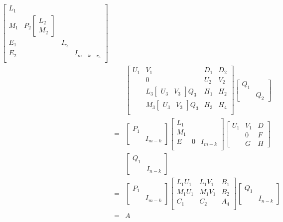 \documentclass{article}
\begin{document}
\begin{eqnarray*}
\left[
  \begin{array}{cccccc}
  L_1 &   \\
  M_1 & P_2
  \begin{bmatrix}
    L_2\\M_2
  \end{bmatrix}\\
  \hline
    E_1 &    & I_{r_3}\\
    E_2 &    & &I_{m-k-r_3}\\
  \end{array}
\right]
\\&&
\left[
\begin{array}{cc|cccc}
  U_1 & V_1 &D_1 & D_2\\
      & 0   & U_2& V_2 \\
      &L_3\begin{bmatrix}U_3&V_3\end{bmatrix} Q_3 &H_1 & H_2\\
      &M_3\begin{bmatrix}U_3&V_3\end{bmatrix} Q_3 &H_3  &H_4\\
\end{array}
\right]
  \begin{bmatrix}
    Q_1\\&Q_2
  \end{bmatrix}\\
&=&\begin{bmatrix}
    P_1\\&I_{m-k}
  \end{bmatrix}
\left[
  \begin{array}{cccccc}
  L_1 &   \\
  M_1 & \\
  \hline
    E &  0  & I_{m-k}\\
  \end{array}
\right]
\left[
\begin{array}{cc|cccc}
  U_1 & V_1 & D\\
      & 0   & F \\
      &G &H
\end{array}
\right]\\&&
  \begin{bmatrix}
    Q_1\\&I_{n-k}
  \end{bmatrix}\\
&=&
\begin{bmatrix}
    P_1\\&I_{m-k}
  \end{bmatrix}
\left[
\begin{array}{cc|c}
  L_1U_1 & L_1V_1 & B_1\\
  M_1U_1    & M_1V_1   & B_2 \\
   C_1 &  C_2  & A_4 \\
\end{array}
\right]
  \begin{bmatrix}
    Q_1\\&I_{n-k}
  \end{bmatrix}\\
&=& A
\end{eqnarray*}
 
\end{document}
